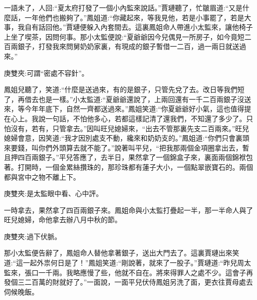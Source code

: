 

\begin{parag}
    一語未了，人回:“夏太府打發了一個小內監來說話。”賈璉聽了，忙皺眉道:“又是什麼話，一年他們也搬夠了。”鳳姐道:“你藏起來，等我見他，若是小事罷了，若是大事，我自有話回他。”賈璉便躲入內套間去。這裏鳳姐命人帶進小太監來，讓他椅子上坐了喫茶，因問何事。那小太監便說:“夏爺爺因今兒偶見一所房子，如今竟短二百兩銀子，打發我來問舅奶奶家裏，有現成的銀子暫借一二百，過一兩日就送過來。”\begin{note}庚雙夾:可謂“密處不容針”。\end{note}鳳姐兒聽了，笑道:“什麼是送過來，有的是銀子，只管先兌了去。改日等我們短了，再借去也是一樣。”小太監道:“夏爺爺還說了，上兩回還有一千二百兩銀子沒送來，等今年年底下，自然一齊都送過來。”鳳姐笑道:“你夏爺爺好小氣，這也值得提在心上。我說一句話，不怕他多心，若都這樣記清了還我們，不知還了多少了。只怕沒有，若有，只管拿去。”因叫旺兒媳婦來，“出去不管那裏先支二百兩來。”旺兒媳婦會意，因笑道:“我才因別處支不動，纔來和奶奶支的。”鳳姐道:“你們只會裏頭來要錢，叫你們外頭算去就不能了。”說著叫平兒，“把我那兩個金項圈拿出去，暫且押四百兩銀子。”平兒答應了，去半日，果然拿了一個錦盒子來，裏面兩個錦袱包著。打開時，一個金累絲攢珠的，那珍珠都有蓮子大小，一個點翠嵌寶石的。兩個都與宮中之物不離上下。\begin{note}庚雙夾:是太監眼中看、心中評。\end{note}一時拿去，果然拿了四百兩銀子來。鳳姐命與小太監打疊起一半，那一半命人與了旺兒媳婦，命他拿去辦八月中秋的節。\begin{note}庚雙夾:過下伏脈。\end{note}那小太監便告辭了，鳳姐命人替他拿著銀子，送出大門去了。這裏賈璉出來笑道:“這一起外祟何日是了！”鳳姐笑道:“剛說著，就來了一股子。”賈璉道:“昨兒周太監來，張口一千兩。我略應慢了些，他就不自在。將來得罪人之處不少。這會子再發個三二百萬的財就好了。”一面說，一面平兒伏侍鳳姐另洗了面，更衣往賈母處去伺候晚飯。
\end{parag}


